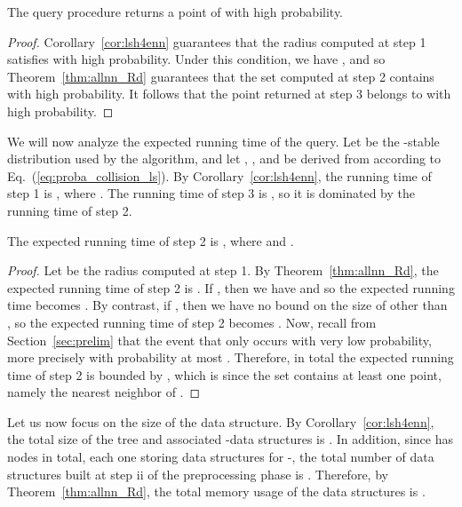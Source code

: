 \begin{lem}\label{lem:exact-nn_correct}
The query procedure returns a point of  with high probability.
\end{lem}
\begin{proof}
Corollary~\ref{cor:lsh4enn} guarantees that the radius  computed at
step 1 satisfies  with high
probability. Under this condition, we have , and so Theorem~\ref{thm:allnn_Rd} guarantees that
the set  computed at step 2 contains  with high
probability. It follows that the point returned at step 3 belongs to
 with high probability.
\end{proof}

We will now analyze the expected running time of the query. Let  be
the -stable distribution used by the algorithm, and let
, ,  and
 be derived from  according
to Eq.~(\ref{eq:proba_collision_ls}). By Corollary~\ref{cor:lsh4enn},
the running time of step 1 is , where . The
running time of step 3 is , so it is dominated by the running
time of step 2.
\begin{lem}\label{lem:exact-nn_runtime}
The expected running time of step 2 is , where
 and .
\end{lem}
\begin{proof}
Let  be the radius computed at step 1. By
Theorem~\ref{thm:allnn_Rd}, the expected running time of step 2 is
. If ,
then we have 
and so the expected running time becomes .  By contrast, if , then we have no bound on the size of
 other than , so the expected running time of
step 2 becomes . Now, recall from Section~\ref{sec:prelim} that the
event that  only occurs with very low
probability, more precisely with probability at most
. Therefore, in total the expected running time of step 2
is bounded by , which is  since the set
 contains at least one point, namely the
nearest neighbor of .
\end{proof}

Let us now focus on the size of the data structure. By
Corollary~\ref{cor:lsh4enn}, the total size of the tree  and
associated -\pleb data structures is . In addition, since  has  nodes
in total, each one storing  data structures
for -\pleb, the total number of  data structures
built at step ii of the preprocessing phase is . Therefore, by Theorem~\ref{thm:allnn_Rd}, the total
memory usage of the  data structures is . 

